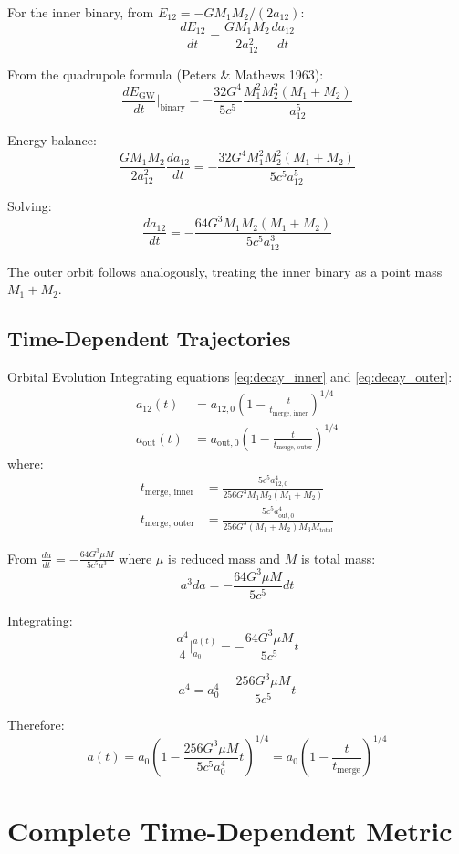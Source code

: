 \documentclass[11pt,a4paper]{article}
\theoremstyle{definition}
\theoremstyle{remark}
\begin{document}
		For the inner binary, from $E_{12} = -GM_1M_2/(2a_{12})$:
		\[
		\frac{dE_{12}}{dt} = \frac{GM_1M_2}{2a_{12}^2}\frac{da_{12}}{dt}
		\]
		
		From the quadrupole formula (Peters \& Mathews 1963):
		\[
		\frac{dE_{\text{GW}}}{dt}\bigg|_{\text{binary}} = -\frac{32G^4}{5c^5}\frac{M_1^2M_2^2(M_1+M_2)}{a_{12}^5}
		\]
		
		Energy balance:
		\[
		\frac{GM_1M_2}{2a_{12}^2}\frac{da_{12}}{dt} = -\frac{32G^4M_1^2M_2^2(M_1+M_2)}{5c^5a_{12}^5}
		\]
		
		Solving:
		\[
		\frac{da_{12}}{dt} = -\frac{64G^3M_1M_2(M_1+M_2)}{5c^5a_{12}^3}
		\]
		
		The outer orbit follows analogously, treating the inner binary as a point mass $M_1 + M_2$.
	
	\subsection{Time-Dependent Trajectories}
	
	Orbital Evolution\label{cor:orbital_evolution}
		Integrating equations \eqref{eq:decay_inner} and \eqref{eq:decay_outer}:
		\begin{align}
			a_{12}(t) &= a_{12,0}\left(1 - \frac{t}{t_{\text{merge, inner}}}\right)^{1/4} \label{eq:a_inner_t}\\
			a_{\text{out}}(t) &= a_{\text{out},0}\left(1 - \frac{t}{t_{\text{merge, outer}}}\right)^{1/4} \label{eq:a_outer_t}
		\end{align}
		where:
		\begin{align}
			t_{\text{merge, inner}} &= \frac{5c^5a_{12,0}^4}{256G^3M_1M_2(M_1+M_2)} \label{eq:t_merge_inner}\\
			t_{\text{merge, outer}} &= \frac{5c^5a_{\text{out},0}^4}{256G^3(M_1+M_2)M_3M_{\text{total}}} \label{eq:t_merge_outer}
		\end{align}
	
		From $\frac{da}{dt} = -\frac{64G^3\mu M}{5c^5a^3}$ where $\mu$ is reduced mass and $M$ is total mass:
		\[
		a^3 da = -\frac{64G^3\mu M}{5c^5}dt
		\]
		
		Integrating:
		\[
		\frac{a^4}{4}\bigg|_{a_0}^{a(t)} = -\frac{64G^3\mu M}{5c^5}t
		\]
		
		\[
		a^4 = a_0^4 - \frac{256G^3\mu M}{5c^5}t
		\]
		
		Therefore:
		\[
		a(t) = a_0\left(1 - \frac{256G^3\mu M}{5c^5a_0^4}t\right)^{1/4} = a_0\left(1 - \frac{t}{t_{\text{merge}}}\right)^{1/4}
		\]
	
	\section{Complete Time-Dependent Metric}
	
\end{document}
